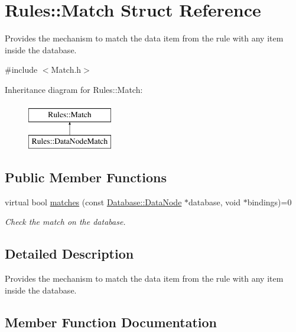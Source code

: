 \hypertarget{structRules_1_1Match}{}\section{Rules\+:\+:Match Struct Reference}
\label{structRules_1_1Match}


Provides the mechanism to match the data item from the rule with any item inside the database.  




{\ttfamily \#include $<$Match.\+h$>$}

Inheritance diagram for Rules\+:\+:Match\+:\begin{figure}[H]
\begin{center}
\leavevmode
\includegraphics[height=2.000000cm]{structRules_1_1Match}
\end{center}
\end{figure}
\subsection*{Public Member Functions}
\begin{DoxyCompactItemize}
\item 
virtual bool \hyperlink{structRules_1_1Match_a41fdfdc0b535e029369be3e18854e14e}{matches} (const \hyperlink{classDatabase_1_1DataNode}{Database\+::\+Data\+Node} $\ast$database, void $\ast$bindings)=0
\begin{DoxyCompactList}\small\item\em Check the match on the database. \end{DoxyCompactList}\end{DoxyCompactItemize}


\subsection{Detailed Description}
Provides the mechanism to match the data item from the rule with any item inside the database. 

\subsection{Member Function Documentation}
